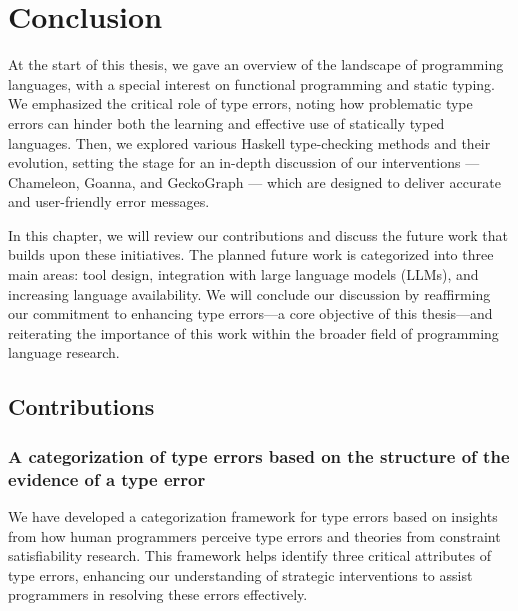 

\chapter{Conclusion}

\label{chap:conclusion} 
\newcommand{\typetutor}{TypeTutor}

\graphicspath{{Figures/Conclusion}}
At the start of this thesis, we gave an overview of the landscape of programming languages, with a special interest on functional programming and static typing. We emphasized the critical role of type errors, noting how problematic type errors can hinder both the learning and effective use of statically typed languages. Then, we explored various Haskell type-checking methods and their evolution, setting the stage for an in-depth discussion of our interventions --- Chameleon, Goanna, and GeckoGraph --- which are designed to deliver accurate and user-friendly error messages.

In this chapter, we will review our contributions and discuss the future work that builds upon these initiatives. The planned future work is categorized into three main areas: tool design, integration with large language models (LLMs), and increasing language availability. We will conclude our discussion by reaffirming our commitment to enhancing type errors—a core objective of this thesis—and reiterating the importance of this work within the broader field of programming language research.


\section{Contributions}


\subsection{A categorization of type errors based on the structure of the evidence of a type error}


We have developed a categorization framework for type errors based on insights from how human programmers perceive type errors and theories from constraint satisfiability research. This framework helps identify three critical attributes of type errors, enhancing our understanding of strategic interventions to assist programmers in resolving these errors effectively.

